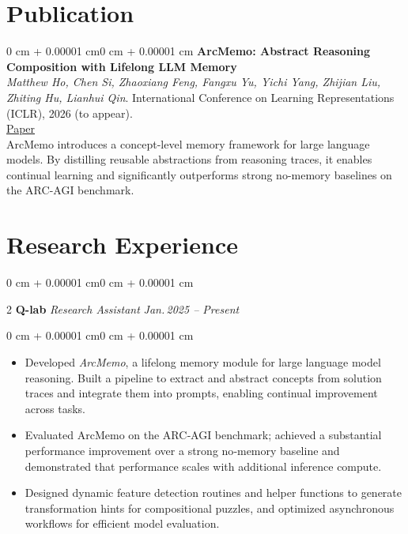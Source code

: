 \documentclass[10pt, letterpaper]{article}
\newenvironment{highlights}{\begin{itemize}[topsep=0.10 cm, parsep=0.10 cm, partopsep=0pt, itemsep=0pt, leftmargin=0 cm + 10pt]}{\end{itemize}}
\newenvironment{onecolentry}{\begin{adjustwidth}{0 cm + 0.00001 cm}{0 cm + 0.00001 cm}}{\end{adjustwidth}}
\newenvironment{twocolentry}[2][]{\onecolentry \def\secondColumn{#2} \setcolumnwidth{\fill, 4.5 cm} \begin{paracol}{2}}{\switchcolumn \raggedleft \secondColumn \end{paracol} \endonecolentry}
\let\hrefWithoutArrow\href
\renewcommand{\href}[2]{\hrefWithoutArrow{#1}{#2}}
\begin{document}
    \section{Publication}

    \begin{onecolentry}
        \textbf{ArcMemo: Abstract Reasoning Composition with Lifelong LLM Memory} \\
        \textit{Matthew Ho, Chen Si, Zhaoxiang Feng, Fangxu Yu, Yichi Yang, Zhijian Liu, Zhiting Hu, Lianhui Qin}. International Conference on Learning Representations (ICLR), 2026 (to appear). \\
        \href{ArcMemo_ICLR.pdf}{Paper} \\
        ArcMemo introduces a concept-level memory framework for large language models. By distilling reusable abstractions from reasoning traces, it enables continual learning and significantly outperforms strong no-memory baselines on the ARC-AGI benchmark.
    \end{onecolentry}

    \section{Research Experience}

    \begin{twocolentry}{\textit{Jan.\,2025 -- Present}}
        \textbf{Q-lab}\newline
        \textit{Research Assistant}
    \end{twocolentry}

    \vspace{0.10 cm}
    \begin{onecolentry}
        \begin{highlights}
            \item Developed \emph{ArcMemo}, a lifelong memory module for large language model reasoning. Built a pipeline to extract and abstract concepts from solution traces and integrate them into prompts, enabling continual improvement across tasks.
            \item Evaluated ArcMemo on the ARC‑AGI benchmark; achieved a substantial performance improvement over a strong no‑memory baseline and demonstrated that performance scales with additional inference compute.
            \item Designed dynamic feature detection routines and helper functions to generate transformation hints for compositional puzzles, and optimized asynchronous workflows for efficient model evaluation.
        \end{highlights}
    \end{onecolentry}
\end{document}

